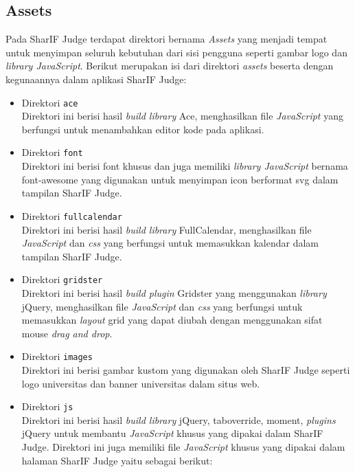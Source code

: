 \subsection{Assets}
Pada SharIF Judge terdapat direktori bernama \textit{Assets} yang menjadi tempat untuk menyimpan seluruh kebutuhan dari sisi pengguna seperti gambar logo dan \textit{library JavaScript}. Berikut merupakan isi dari direktori \textit{assets} beserta dengan kegunaannya dalam aplikasi SharIF Judge:

\begin{itemize}
	\item Direktori \verb|ace| \\
	      Direktori ini berisi hasil \textit{build library} Ace, menghasilkan file \textit{JavaScript} yang berfungsi untuk menambahkan editor kode pada aplikasi.
	\item Direktori \verb|font| \\
	      Direktori ini berisi font khusus dan juga memiliki \textit{library JavaScript} bernama font-awesome yang digunakan untuk menyimpan icon berformat svg dalam tampilan SharIF Judge.
	\item Direktori \verb|fullcalendar| \\
	      Direktori ini berisi hasil \textit{build library} FullCalendar, menghasilkan file \textit{JavaScript} dan \textit{css} yang berfungsi untuk memasukkan kalendar dalam tampilan SharIF Judge.
	      \newpage
	\item Direktori \verb|gridster| \\
	      Direktori ini berisi hasil \textit{build plugin} Gridster yang menggunakan \textit{library} jQuery, menghasilkan file \textit{JavaScript} dan \textit{css} yang berfungsi untuk memasukkan \textit{layout} grid yang dapat diubah dengan menggunakan sifat mouse \textit{drag and drop}.
	\item Direktori \verb|images| \\
	      Direktori ini berisi gambar kustom yang digunakan oleh SharIF Judge seperti logo universitas dan banner universitas dalam situs web.
	\item Direktori \verb|js| \\
	      Direktori ini berisi hasil \textit{build library} jQuery, taboverride, moment, \textit{plugins} jQuery untuk membantu \textit{JavaScript} khusus yang dipakai dalam SharIF Judge. Direktori ini juga memiliki file \textit{JavaScript} khusus yang dipakai dalam halaman SharIF Judge yaitu sebagai berikut:
	      \begin{itemize}

\end{itemize}
\end{itemize}
